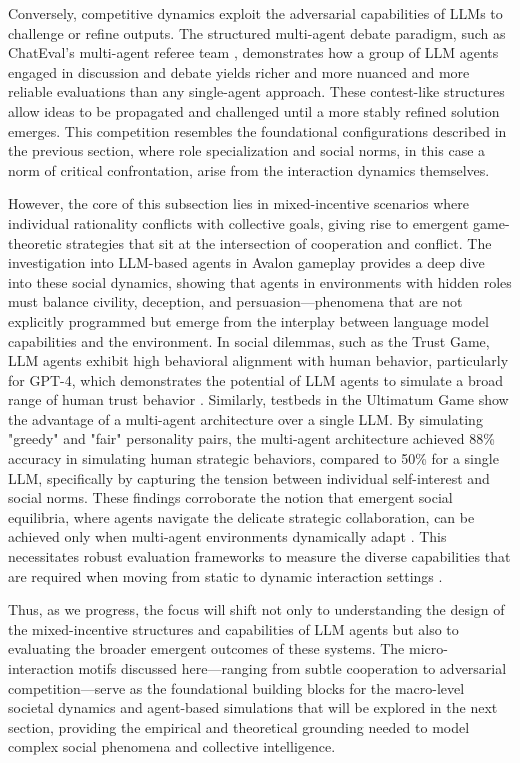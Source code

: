 \documentclass[11pt,a4paper]{article}
\begin{document}
Conversely, competitive dynamics exploit the adversarial capabilities of LLMs to challenge or refine outputs. The structured multi-agent debate paradigm, such as ChatEval's multi-agent referee team \cite{arxiv:2308.07201v1}, demonstrates how a group of LLM agents engaged in discussion and debate yields richer and more nuanced and more reliable evaluations than any single-agent approach. These contest-like structures allow ideas to be propagated and challenged until a more stably refined solution emerges. This competition resembles the foundational configurations described in the previous section, where role specialization and social norms, in this case a norm of critical confrontation, arise from the interaction dynamics themselves.

However, the core of this subsection lies in mixed-incentive scenarios where individual rationality conflicts with collective goals, giving rise to emergent game-theoretic strategies that sit at the intersection of cooperation and conflict. The investigation into LLM-based agents in Avalon gameplay \cite{arxiv:2310.14985v3} provides a deep dive into these social dynamics, showing that agents in environments with hidden roles must balance civility, deception, and persuasion---phenomena that are not explicitly programmed but emerge from the interplay between language model capabilities and the environment. In social dilemmas, such as the Trust Game, LLM agents exhibit high behavioral alignment with human behavior, particularly for GPT-4, which demonstrates the potential of LLM agents to simulate a broad range of human trust behavior \cite{arxiv:2402.04559v2}. Similarly, testbeds in the Ultimatum Game \cite{arxiv:2402.08189v1} show the advantage of a multi-agent architecture over a single LLM. By simulating "greedy" and "fair" personality pairs, the multi-agent architecture achieved 88\% accuracy in simulating human strategic behaviors, compared to 50\% for a single LLM, specifically by capturing the tension between individual self-interest and social norms. These findings corroborate the notion that emergent social equilibria, where agents navigate the delicate strategic collaboration, can be achieved only when multi-agent environments dynamically adapt \cite{arxiv:2310.10701v2}. This necessitates robust evaluation frameworks to measure the diverse capabilities that are required when moving from static to dynamic interaction settings \cite{arxiv:2402.11443v1}.

Thus, as we progress, the focus will shift not only to understanding the design of the mixed-incentive structures and capabilities of LLM agents but also to evaluating the broader emergent outcomes of these systems. The micro-interaction motifs discussed here---ranging from subtle cooperation to adversarial competition---serve as the foundational building blocks for the macro-level societal dynamics and agent-based simulations that will be explored in the next section, providing the empirical and theoretical grounding needed to model complex social phenomena and collective intelligence.
\end{document}
